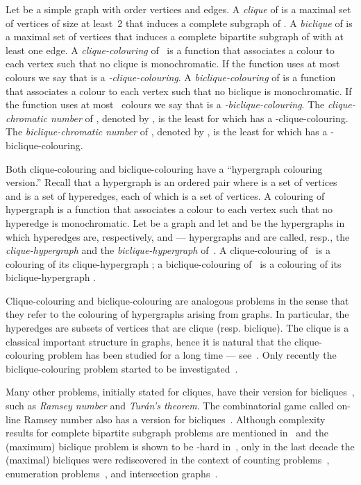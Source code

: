 \documentclass{article}
\begin{document}
Let  be a simple graph with order  vertices and
 edges.
A \emph{clique} of  is a maximal set of vertices of size at least~2 that
induces a complete subgraph of .
A \emph{biclique} of  is a maximal set of vertices that induces a complete
bipartite subgraph of  with at least one edge.
A \emph{clique-colouring} of~ is a function  that associates a colour to
each vertex such that no clique is monochromatic. If the function uses at
most~ colours we say that  is a \emph{-clique-colouring}.
A \emph{biclique-colouring} of  is a function  that associates a colour
to each vertex such that no biclique is monochromatic. If the function 
uses at most~ colours we say that  is a \emph{-biclique-colouring}.
The \emph{clique-chromatic number} of , denoted by , is the least
 for which  has a -clique-colouring. The \emph{biclique-chromatic
number} of , denoted by , is the least  for which  has a
-biclique-colouring.

Both clique-colouring and biclique-colouring have a ``hypergraph colouring
version.'' Recall that a hypergraph  is an ordered
pair where  is a set of vertices and  is a set of hyperedges,
each of which is a set of vertices. A colouring of hypergraph
 is a function that associates a colour to each
vertex such that no hyperedge is monochromatic. Let  be a graph and let
 and 
be the hypergraphs in which hyperedges are, respectively,  and  --- hypergraphs  and
 are called, resp., the \emph{clique-hypergraph} and the
\emph{biclique-hypergraph} of~. A clique-colouring of~ is a colouring of
its clique-hypergraph ; a biclique-colouring of~ is a
colouring of its biclique-hypergraph .


Clique-colouring and biclique-colouring are analogous problems in the sense that
they refer to the colouring of hypergraphs arising from graphs.
In particular, the hyperedges are subsets of vertices that are clique (resp. biclique).
The clique is a classical important
structure in graphs, hence it is natural that the clique-colouring problem has
been studied for a long time ---
see~\cite{Bacso,Defossez,Kratochvil,DanielMarx}. 
Only recently the biclique-colouring problem started to be
investigated~\cite{1210.7269}. 

Many other problems, initially stated for cliques, have
their version for bicliques~\cite{MR0409253,MR0065617}, such as
\emph{Ramsey number} and \emph{Tur\'an's theorem}.
The combinatorial game called on-line Ramsey
number also has a version for bicliques~\cite{MR2594965}. Although complexity
results for complete bipartite subgraph problems are mentioned
in~\cite{GareyJohnson} and the (maximum) biclique problem is shown to be
-hard in~\cite{Yannakakis}, only in the last decade the (maximal)
bicliques were rediscovered in the context of counting
problems~\cite{Gaspers,Prisner}, enumeration problems~\cite{Dias1,Nourine1}, and
intersection graphs~\cite{MarinaJayme}. 
\end{document}
